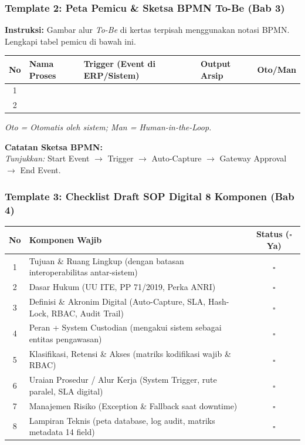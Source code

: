 \documentclass[11pt,a4paper]{article}
\begin{document}
\vspace{0.4cm}

\subsubsection*{Template 2: Peta Pemicu \& Sketsa BPMN To-Be (Bab 3)}
\small
\textbf{Instruksi:} Gambar alur \textit{To-Be} di kertas terpisah menggunakan notasi BPMN. Lengkapi tabel pemicu di bawah ini.

\begin{table}[h!]
\centering\small
\renewcommand{\arraystretch}{1.6}
\begin{tabularx}{\textwidth}{@{} c X X X c @{}}
\toprule
\textbf{No} & \textbf{Nama Proses} & \textbf{Trigger (Event di ERP/Sistem)} & \textbf{Output Arsip} & \textbf{Oto/Man} \\
\midrule
1 & & & & \\
\hline
2 & & & & \\
\bottomrule
\end{tabularx}
\end{table}
\textit{Oto = Otomatis oleh sistem; Man = Human-in-the-Loop.}

\vspace{0.3cm}
\noindent\textbf{Catatan Sketsa BPMN:}\\
\textit{Tunjukkan:} Start Event $\rightarrow$ Trigger $\rightarrow$ Auto-Capture $\rightarrow$ Gateway Approval $\rightarrow$ End Event.

\vspace{0.4cm}

\subsubsection*{Template 3: Checklist Draft SOP Digital 8 Komponen (Bab 4)}
\begin{table}[h!]
\centering\small
\renewcommand{\arraystretch}{1.5}
\begin{tabularx}{\textwidth}{@{} c X c @{}}
\toprule
\textbf{No} & \textbf{Komponen Wajib} & \textbf{Status ($\square$ Ya)} \\
\midrule
1 & Tujuan \& Ruang Lingkup (dengan batasan interoperabilitas antar-sistem) & $\square$ \\
2 & Dasar Hukum (UU ITE, PP 71/2019, Perka ANRI) & $\square$ \\
3 & Definisi \& Akronim Digital (Auto-Capture, SLA, Hash-Lock, RBAC, Audit Trail) & $\square$ \\
4 & Peran + System Custodian (mengakui sistem sebagai entitas pengawasan) & $\square$ \\
5 & Klasifikasi, Retensi \& Akses (matriks kodifikasi wajib \& RBAC) & $\square$ \\
6 & Uraian Prosedur / Alur Kerja (System Trigger, rute paralel, SLA digital) & $\square$ \\
7 & Manajemen Risiko (Exception \& Fallback saat downtime) & $\square$ \\
8 & Lampiran Teknis (peta database, log audit, matriks metadata 14 field) & $\square$ \\
\bottomrule
\end{tabularx}
\end{table}
\end{document}
